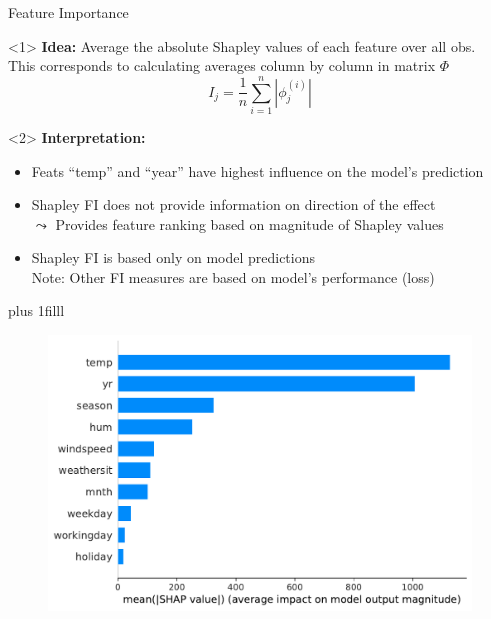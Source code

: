 \documentclass[10pt,compress,t,notes=noshow, xcolor=table]{beamer}
\newcommand{\btVFill}{\vskip0pt plus 1filll}
\begin{document}
 \begin{frame}{Feature Importance}

\begin{onlyenv}<1>
\textbf{Idea:} Average the absolute Shapley values of each feature over all obs. \\This corresponds to calculating averages column by column in matrix $\Phi$
$$
I_{j}=\frac{1}{n} \sum_{i=1}^{n}\left|\phi_{j}^{(i)}\right|
$$
\end{onlyenv}

\begin{onlyenv}<2>
\textbf{Interpretation:}
\begin{itemize}
    \item Feats \enquote{temp} and \enquote{year} have highest influence on the model's prediction
    \item Shapley FI does not provide information on direction of the effect\\
    $\leadsto$ Provides feature ranking based on magnitude of  Shapley values %
    \item Shapley FI is based only on model predictions\\
    Note: Other FI measures are based on model's performance (loss)
\end{itemize}
 
\end{onlyenv}


\btVFill

\begin{figure}
    \centering
    \includegraphics[width=0.5\columnwidth]{figure_man/global_shap_fi.pdf}
\end{figure}

\end{frame}
 
\end{document}
